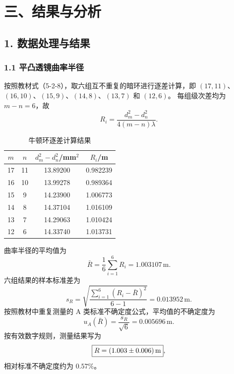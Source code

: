 \section*{三、结果与分析}

\subsection*{1. 数据处理与结果}

\subsubsection*{1.1 平凸透镜曲率半径}

按照教材式（5-2-8），取六组互不重复的暗环进行逐差计算，即
$(17,11)$、$(16,10)$、$(15,9)$、$(14,8)$、$(13,7)$ 和 $(12,6)$。
每组级次差均为 $m-n=6$，故
\begin{equation}
  R_i=\frac{d_m^2-d_n^2}{4(m-n)\lambda}.
\end{equation}

\begin{table}[H]
  \centering
  \caption{牛顿环逐差计算结果}
  \label{tab:newton-result}
  \begin{tabular}{cccc}
    \toprule
    $m$ & $n$ & $d_m^2-d_n^2$/mm$^2$ & $R_i$/m \\
    \midrule
    17 & 11 & 13.89200 & 0.982239 \\
    16 & 10 & 13.99278 & 0.989364 \\
    15 &  9 & 14.23900 & 1.006773 \\
    14 &  8 & 14.37104 & 1.016109 \\
    13 &  7 & 14.29063 & 1.010424 \\
    12 &  6 & 14.33740 & 1.013731 \\
    \bottomrule
  \end{tabular}
\end{table}

曲率半径的平均值为
\begin{equation}
  \bar R=\frac{1}{6}\sum_{i=1}^{6}R_i=1.003107\,\mathrm{m}.
\end{equation}
六组结果的样本标准差为
\begin{equation}
  s_R=\sqrt{\frac{\sum_{i=1}^{6}(R_i-\bar R)^2}{6-1}}
  =0.013952\,\mathrm{m}.
\end{equation}
按照教材中重复测量的 A 类标准不确定度公式，平均值的不确定度为
\begin{equation}
  u_A(\bar R)=\frac{s_R}{\sqrt 6}=0.005696\,\mathrm{m}.
\end{equation}
按有效数字规则，测量结果写为
\begin{equation}
  \boxed{R=(1.003\pm0.006)\,\mathrm{m}},
\end{equation}
相对标准不确定度约为 $0.57\%$。

